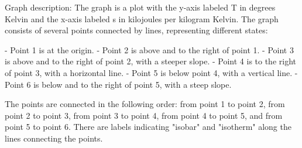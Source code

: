 Graph description: The graph is a plot with the y-axis labeled T in degrees Kelvin and the x-axis labeled s in kilojoules per kilogram Kelvin. The graph consists of several points connected by lines, representing different states:

- Point 1 is at the origin.
- Point 2 is above and to the right of point 1.
- Point 3 is above and to the right of point 2, with a steeper slope.
- Point 4 is to the right of point 3, with a horizontal line.
- Point 5 is below point 4, with a vertical line.
- Point 6 is below and to the right of point 5, with a steep slope.

The points are connected in the following order: from point 1 to point 2, from point 2 to point 3, from point 3 to point 4, from point 4 to point 5, and from point 5 to point 6. There are labels indicating "isobar" and "isotherm" along the lines connecting the points.